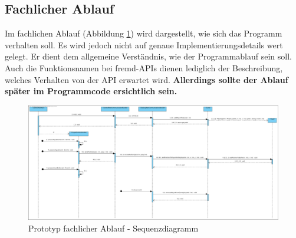 \subsection{Fachlicher Ablauf}
Im fachlichen Ablauf (Abbildung \ref{Prototyp fachlicher Ablauf - Sequenzdiagramm}) wird dargestellt, wie sich das Programm verhalten soll. Es wird jedoch nicht auf genaue Implementierungsdetails wert gelegt. Er dient dem allgemeine Verständnis, wie der Programmablauf sein soll. Auch die Funktionsnamen bei fremd-APIs dienen lediglich der Beschreibung, welches Verhalten von der API erwartet wird. \textbf{Allerdings sollte der Ablauf später im Programmcode ersichtlich sein.}
\begin{figure}[ht]
	\centering
	\includegraphics[width = 0.9\textheight, angle=270]{architecture/PrototypeSequenceDiagram.png}
	\caption{Prototyp fachlicher Ablauf - Sequenzdiagramm}
	\label{Prototyp fachlicher Ablauf - Sequenzdiagramm}
\end{figure}
